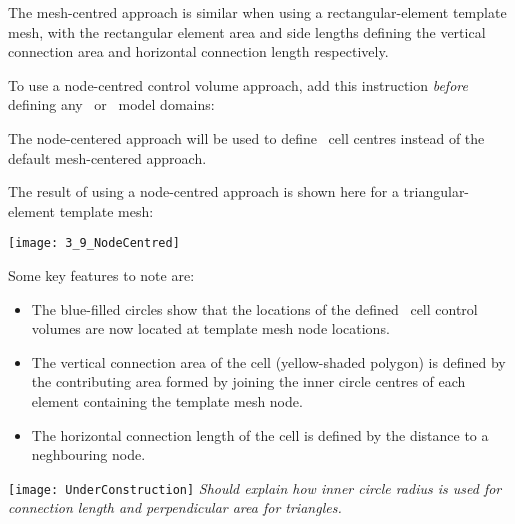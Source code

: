 The mesh-centred approach is similar when using a  rectangular-element template mesh, with the rectangular element area and side lengths defining the vertical connection area and horizontal connection length respectively.

To use a node-centred control volume approach, add this instruction {\em before} defining any \gwf\ or \swf\ model domains:

    {The node-centered approach will be used to define \mf\ cell centres instead of the default mesh-centered approach.
     }

The result of using a node-centred approach is shown here for a triangular-element template mesh:

    \texttt{[image: 3\_9\_NodeCentred]}

Some key features to note are:
\begin{itemize}
    \item The blue-filled circles show that the locations of the defined \mf\ cell control volumes are now located at template mesh node locations.
    \item The vertical connection area of the cell (yellow-shaded polygon) is defined by the contributing area formed by joining the inner circle centres of each element containing the template mesh node.
    \item The horizontal connection length of the cell is defined by the distance to a neghbouring node.
\end{itemize}


\texttt{[image: UnderConstruction]} \textit{Should explain how inner circle radius is used for connection length and perpendicular area for triangles.}



